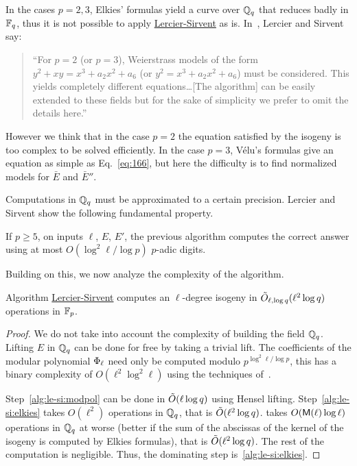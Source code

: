\begin{nota}
    In the cases $p=2,3$, Elkies'
  formulas yield a curve over $\mathbb{Q}_q$ that reduces badly in $\mathbb{F}_q$,
  thus it is not possible to apply
  \hyperref[alg:le-si]{Lercier-Sirvent} as is.
  In~\cite{lercier+sirvent08}, Lercier and Sirvent say:
  \begin{quote}
    ``For $p = 2$ (or $p = 3$), Weierstrass models of the form $y^2 + xy
    = x^3 + a_2 x^2 + a_6$ (or $y^2 = x^3 + a_2 x^2 + a_6$) must be
    considered. This yields completely different equations\dots [The
    algorithm] can be easily extended to these fields but for the
    sake of simplicity we prefer to omit the details here.''
  \end{quote}
  
  However we think that in the case $p=2$ the equation satisfied by
  the isogeny is too complex to be solved efficiently. In the case
  $p=3$, Vélu's formulas give an equation as simple as
  Eq.~\eqref{eq:166}, but here the difficulty is to find normalized
  models for $\bar{E}$ and $\bar{E}''$.
\end{nota}

Computations in $\mathbb{Q}_q$ must be approximated to a certain
precision. Lercier and Sirvent show the following fundamental
property.

\begin{proposition}
  If $p\ge5$, on inputs $\ell$, $E$, $E'$, the previous algorithm
  computes the correct answer using at most $O(\log^2\ell/\log p)$
  $p$-adic digits.
\end{proposition}

Building on this, we now analyze the complexity of the algorithm.

\begin{proposition}
  \label{th:lercier-sirvent}
  Algorithm \hyperref[alg:le-si]{Lercier-Sirvent} computes an
  $\ell$-degree isogeny in $\tilde{O}_{\ell,\log q}(\ell^2\log q)$
  operations in $\mathbb{F}_p$.
\end{proposition}
\begin{proof}
  We do not take into account the complexity of building the field
  $\mathbb{Q}_q$. Lifting $E$ in $\mathbb{Q}_q$ can be done for free by taking a
  trivial lift. The coefficients of the modular polynomial
  $\Phi_\ell$ need only be computed modulo $p^{\log^2\ell/\log p}$,
  this has a binary complexity of $O(\ell^2\log^2\ell)$ using the
  techniques of~\cite{sutherland10:modpol}.

  Step~\ref{alg:le-si:modpol} can be done in $\tilde{O}(\ell\log q)$
  using Hensel lifting. Step~\ref{alg:le-si:elkies} takes $O(\ell^2)$
  operations in $\mathbb{Q}_q$, that is $\tilde{O}(\ell^2\log
  q)$. \hyperref[alg:bmss]{} takes $O(\mathsf{M}(\ell)\log\ell)$
  operations in $\mathbb{Q}_q$ at worse (better if the sum of the abscissas of
  the kernel of the isogeny is computed by Elkies formulas), that is
  $\tilde{O}(\ell^2\log q)$. The rest of the computation is
  negligible. Thus, the dominating step is~\ref{alg:le-si:elkies}.
\end{proof}


